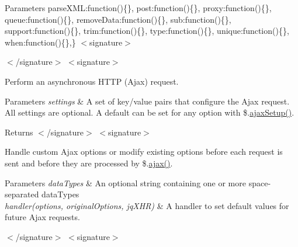 \begin{DoxyParams}{Parameters}
\textquotesingle{}parse\+X\+ML\textquotesingle{}\+:function()\{\}, \textquotesingle{}post\textquotesingle{}\+:function()\{\}, \textquotesingle{}proxy\textquotesingle{}\+:function()\{\}, \textquotesingle{}queue\textquotesingle{}\+:function()\{\}, \textquotesingle{}remove\+Data\textquotesingle{}\+:function()\{\}, \textquotesingle{}sub\textquotesingle{}\+:function()\{\}, \textquotesingle{}support\textquotesingle{}\+:function()\{\}, \textquotesingle{}trim\textquotesingle{}\+:function()\{\}, \textquotesingle{}type\textquotesingle{}\+:function()\{\}, \textquotesingle{}unique\textquotesingle{}\+:function()\{\}, \textquotesingle{}when\textquotesingle{}\+:function()\{\},\} $<$signature$>$ 
 $<$/signature$>$ $<$signature$>$ \\
\hline
\end{DoxyParams}
Perform an asynchronous H\+T\+TP (Ajax) request.


\begin{DoxyParams}{Parameters}
{\em settings} & A set of key/value pairs that configure the Ajax request. All settings are optional. A default can be set for any option with \$.\hyperlink{jquery-2_82_81-vsdoc_8js_a3b12f4f2a83dfdae4e81bcaeaf2a2f42}{ajax\+Setup()}.\\
\hline
\end{DoxyParams}
\begin{DoxyReturn}{Returns}
$<$/signature$>$ $<$signature$>$ 

Handle custom Ajax options or modify existing options before each request is sent and before they are processed by \$.\hyperlink{jquery-2_82_81-vsdoc_8js_a3c9e2ac71a76356869090140308936dc}{ajax()}.
\end{DoxyReturn}

\begin{DoxyParams}{Parameters}
{\em data\+Types} & An optional string containing one or more space-\/separated data\+Types\\
\hline
{\em handler(options, original\+Options, jq\+X\+H\+R)} & A handler to set default values for future Ajax requests.\\
\hline
\end{DoxyParams}
$<$/signature$>$ $<$signature$>$ 

